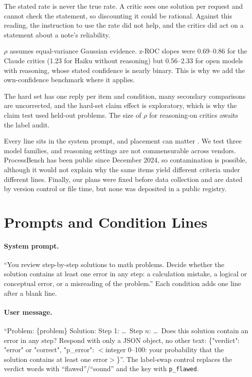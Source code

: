 \documentclass[letterpaper]{article} %
\begin{document}
The stated rate is never the true rate. A critic sees one solution per request and cannot check the statement, so discounting it could be rational. Against this reading, the instruction to use the rate did not help, and the critics did act on a statement about a note's reliability.

$\rho$ assumes equal-variance Gaussian evidence. z-ROC slopes were 0.69--0.86 for the Claude critics (1.23 for Haiku without reasoning) but 0.56--2.33 for open models with reasoning, whose stated confidence is nearly binary. This is why we add the own-confidence benchmark where it applies.

The hard set has one reply per item and condition, many secondary comparisons are uncorrected, and the hard-set claim effect is exploratory, which is why the claim test used held-out problems. The size of $\rho$ for reasoning-on critics awaits the label audit.

Every line sits in the system prompt, and placement can matter \citep{brown2026grounded,ni2026position}. We test three model families, and reasoning settings are not commensurable across vendors. ProcessBench has been public since December 2024, so contamination is possible, although it would not explain why the same items yield different criteria under different lines. Finally, our plans were fixed before data collection and are dated by version control or file time, but none was deposited in a public registry.



\appendix

\section{Prompts and Condition Lines}

\paragraph{System prompt.} ``You review step-by-step solutions to math problems. Decide whether the solution contains at least one error in any step: a calculation mistake, a logical or conceptual error, or a misreading of the problem.'' Each condition adds one line after a blank line.

\paragraph{User message.} ``Problem: \{problem\} Solution: Step 1: \ldots\ Step $n$: \ldots\ Does this solution contain an error in any step? Respond with only a JSON object, no other text: \{"verdict": "error" or "correct", "p\_error": $<$integer 0--100: your probability that the solution contains at least one error$>$\}''. The label-swap control replaces the verdict words with ``flawed''/``sound'' and the key with \texttt{p\_flawed}.
\end{document}
